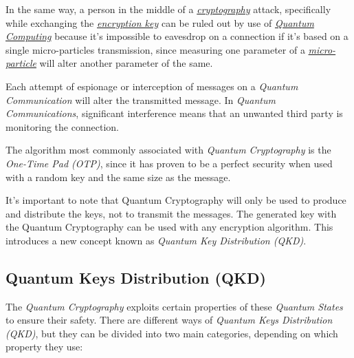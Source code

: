 \documentclass[conference]{IEEEtran}
\begin{document}
\vspace{4pt}

In the same way, a person in the middle of a \href{https://en.wikipedia.org/wiki/Cryptography}{\textit{cryptography}} attack, specifically while exchanging the \href{https://en.wikipedia.org/wiki/Key_(cryptography)}{\textit{encryption key}} can be ruled out by use of \href{https://en.wikipedia.org/wiki/Quantum_computing}{\textit{Quantum Computing}} because it's impossible to eavesdrop on a connection if it's based on a single micro-particles transmission, since measuring one parameter of a \href{https://en.wikipedia.org/wiki/Microparticle}{\textit{micro-particle}} will alter another parameter of the same.

\vspace{4pt}

Each attempt of espionage or interception of messages on a \textit{Quantum Communication} will alter the transmitted message. In \textit{Quantum Communications}, significant interference means that an unwanted third party is monitoring the connection.

\vspace{4pt}

The algorithm most commonly associated with \textit{Quantum Cryptography} is the \textit{One-Time Pad (OTP)}, since it has proven to be a perfect security when used with a random key and the same size as the message.

\vspace{4pt}

It's important to note that Quantum Cryptography will only be used to produce and distribute the keys, not to transmit the messages. The generated key with the Quantum Cryptography can be used with any encryption algorithm. This introduces a new concept known as \textit{Quantum Key Distribution (QKD)}.

\vspace{6pt}

\subsection{Quantum Keys Distribution (QKD)}\label{A4}

\vspace{4pt}

The \textit{Quantum Cryptography} exploits certain properties of these \textit{Quantum States} to ensure their safety. There are different ways of \textit{Quantum Keys Distribution (QKD)}, but they can be divided into two main categories, depending on which property they use:
\end{document}
